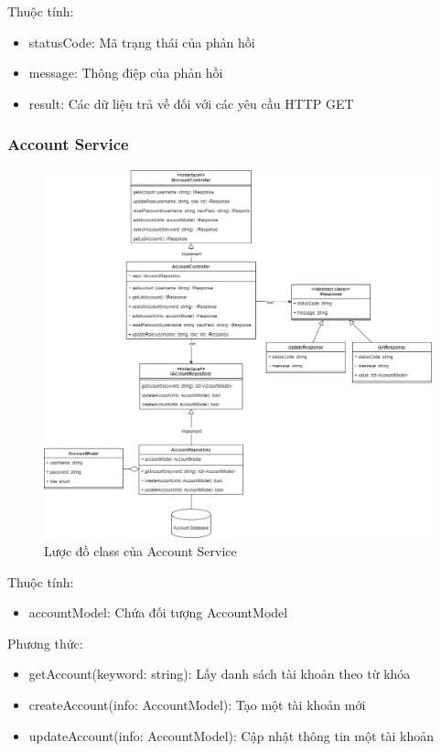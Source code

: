 Thuộc tính:
\begin{itemize}
	\item statusCode: Mã trạng thái của phản hồi
	\item message: Thông điệp của phản hồi
	\item result: Các dữ liệu trả về đối với các yêu cầu HTTP GET
\end{itemize}

\newpage


\subsubsection{Account Service}
\begin{figure}[!htp]
	\centering
	\includegraphics[width=14cm]{img/Architecture/service/AccountService.png}
	\newline
	\caption{Lược đồ class của Account Service}
\end{figure}

Thuộc tính:
\begin{itemize}
	\item accountModel: Chứa đối tượng AccountModel
\end{itemize}
Phương thức:
\begin{itemize}
	\item getAccount(keyword: string): Lấy danh sách tài khoản theo từ khóa
	\item createAccount(info: AccountModel): Tạo một tài khoản mới
	\item updateAccount(info: AccountModel): Cập nhật thông tin một tài khoản
\end{itemize}

